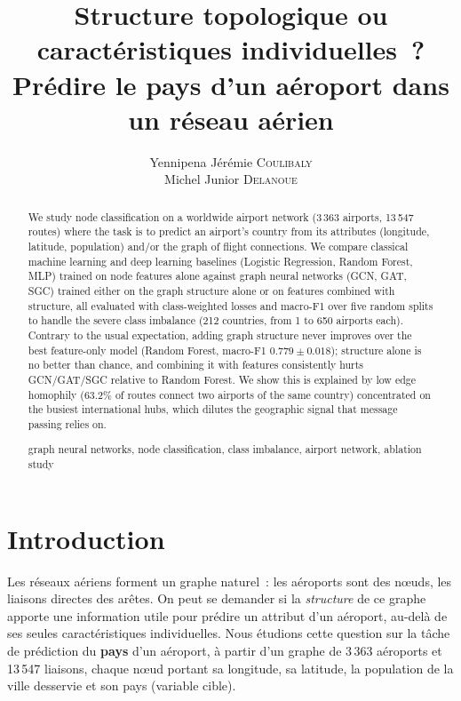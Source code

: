 \documentclass[french]{llncs}
\title{Structure topologique ou caractéristiques individuelles~? Prédire le pays d'un aéroport dans un réseau aérien}
\author{ Yennipena Jérémie \textsc{Coulibaly} \\
         Michel Junior \textsc{Delanoue} }
\institute{Université Claude Bernard Lyon 1, France \\
\url{https://github.com/cyjere/rendu-tp-gnn-Coulibaly-and-Delanoue}}
\begin{document}
    \renewcommand{\thelstlisting}{\arabic{lstlisting}}

    \maketitle

    \begin{abstract}
        We study node classification on a worldwide airport network (3\,363 airports, 13\,547 routes) where the task is to 
        predict an airport's country from its attributes (longitude, latitude, population) and/or the graph of flight connections.
         We compare classical machine learning and deep learning baselines (Logistic Regression, Random Forest, MLP) 
         trained on node features alone against graph neural networks (GCN, GAT, SGC) trained either on the graph structure 
         alone or on features combined with structure, all evaluated with class-weighted losses and macro-F1 over five random 
         splits to handle the severe class imbalance (212 countries, from 1 to 650 airports each). Contrary to the usual 
         expectation, adding graph structure never improves over the best feature-only model 
         (Random Forest, macro-F1 $0.779 \pm 0.018$); structure alone is no better than chance, 
         and combining it with features consistently hurts GCN/GAT/SGC relative to Random Forest. 
         We show this is explained by low edge homophily (63.2\% of routes connect two airports of the same country) 
         concentrated on the busiest international hubs, which dilutes the geographic signal that message passing relies on.

         \begin{keywords}
        graph neural networks, node classification, class imbalance, airport network, ablation study
    \end{keywords}
    \end{abstract}



    \section{Introduction} \label{intro}

    Les réseaux aériens forment un graphe naturel~: les aéroports sont des nœuds, les liaisons directes des arêtes. 
    On peut se demander si la \emph{structure} de ce graphe apporte une information utile pour prédire un attribut d'un aéroport,
     au-delà de ses seules caractéristiques individuelles. Nous étudions cette question sur la tâche de prédiction du 
     \textbf{pays} d'un aéroport, à partir d'un graphe de 3\,363 aéroports et 13\,547 liaisons, chaque nœud portant sa longitude,
      sa latitude, la population de la ville desservie et son pays (variable cible).
\end{document}
